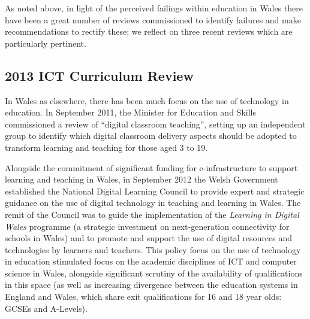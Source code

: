 As noted above, in light of the perceived failings within education in
Wales there have been a great number of reviews commissioned to
identify failures and make recommendations to rectify these; we
reflect on three recent reviews which are particularly pertinent.

\subsection{2013 ICT Curriculum Review}



In Wales as elsewhere, there has been much focus on the use of
technology in education. In September 2011, the Minister for Education
and Skills commissioned a review of ``digital classroom teaching'',
setting up an independent group to identify which digital classroom
delivery aspects should be adopted to transform learning and teaching
for those aged 3 to 19.


Alongside the commitment of significant funding for e-infrastructure
to support learning and teaching in Wales, in September 2012 the Welsh
Government established the National Digital Learning Council to
provide expert and strategic guidance on the use of digital technology
in teaching and learning in Wales.  The remit of the Council was to
guide the implementation of the {\emph{Learning in Digital Wales}}
programme (a strategic investment on next-generation connectivity for
schools in Wales) and to promote and support the use of digital
resources and technologies by learners and teachers. This policy focus
on the use of technology in education stimulated focus on the academic
disciplines of ICT and computer science in Wales, alongside
significant scrutiny of the availability of
qualifications~\cite{raeng-comp-quals:2012} in this space (as well as
increasing divergence between the education systems in England and
Wales, which share exit qualifications for 16 and 18 year olds: GCSEs
and A-Levels).

